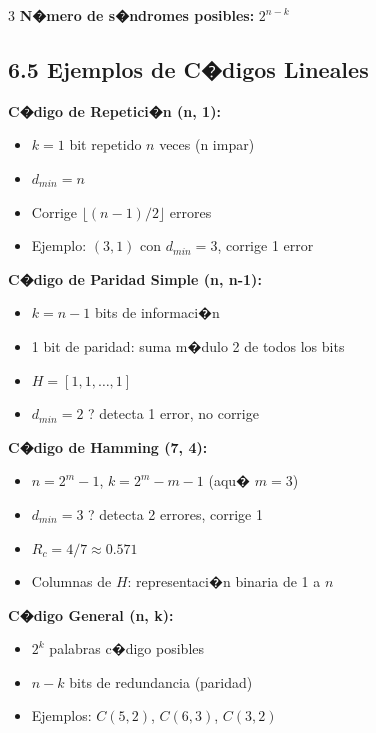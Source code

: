 ﻿\documentclass[8pt,a4paper]{article}
\begin{document}
\begin{multicols}{3}
\textbf{N�mero de s�ndromes posibles:} $2^{n-k}$

\vspace{-2mm}
\subsection*{\small 6.5 Ejemplos de C�digos Lineales}
\vspace{-2mm}

\textbf{C�digo de Repetici�n (n, 1):}
\begin{itemize}[leftmargin=*,itemsep=0pt]
    \item $k=1$ bit repetido $n$ veces (n impar)
    \item $d_{min} = n$
    \item Corrige $\lfloor (n-1)/2 \rfloor$ errores
    \item Ejemplo: $(3,1)$ con $d_{min}=3$, corrige 1 error
\end{itemize}

\textbf{C�digo de Paridad Simple (n, n-1):}
\begin{itemize}[leftmargin=*,itemsep=0pt]
    \item $k = n-1$ bits de informaci�n
    \item 1 bit de paridad: suma m�dulo 2 de todos los bits
    \item $H = [1, 1, \ldots, 1]$
    \item $d_{min} = 2$ ? detecta 1 error, no corrige
\end{itemize}

\textbf{C�digo de Hamming (7, 4):}
\begin{itemize}[leftmargin=*,itemsep=0pt]
    \item $n = 2^m - 1$, $k = 2^m - m - 1$ (aqu� $m=3$)
    \item $d_{min} = 3$ ? detecta 2 errores, corrige 1
    \item $R_c = 4/7 \approx 0.571$
    \item Columnas de $H$: representaci�n binaria de 1 a $n$
\end{itemize}

\textbf{C�digo General (n, k):}
\begin{itemize}[leftmargin=*,itemsep=0pt]
    \item $2^k$ palabras c�digo posibles
    \item $n-k$ bits de redundancia (paridad)
    \item Ejemplos: $C(5,2)$, $C(6,3)$, $C(3,2)$
\end{itemize}


\end{multicols}
\end{document}
